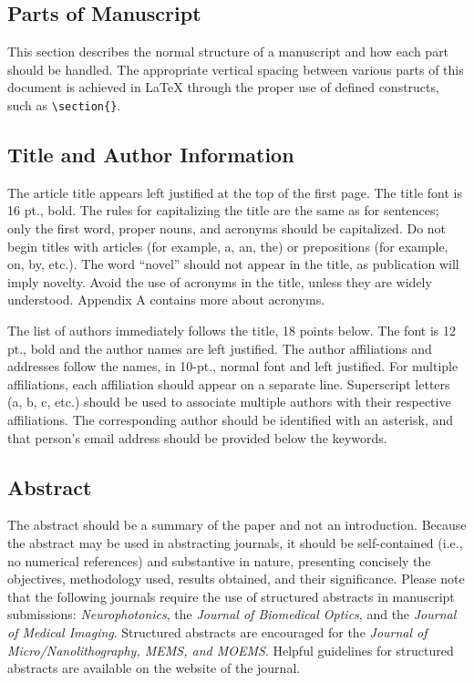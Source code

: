 \documentclass[12pt]{spieman}  %
\begin{document}
\begin{spacing}{2}
\section{Parts of Manuscript}

This section describes the normal structure of a manuscript and how each part should be handled. The appropriate vertical spacing between various parts of this document is achieved in LaTeX through the proper use of defined constructs, such as \verb|\section{}|.

\subsection{Title and Author Information}
\label{sect:title}
The article title appears left justified at the top of the first page. The title font is 16 pt., bold. The rules for capitalizing the title are the same as for sentences; only the first word, proper nouns, and acronyms should be capitalized. Do not begin titles with articles (for example, a, an, the) or prepositions (for example, on, by, etc.). The word ``novel'' should not appear in the title, as publication will imply novelty. Avoid the use of acronyms in the title, unless they are widely understood. Appendix A contains more about acronyms.

The list of authors immediately follows the title, 18 points below. The font is 12 pt., bold and the author names are left justified. The author affiliations and addresses follow the names, in 10-pt., normal font and left justified. For multiple affiliations, each affiliation should appear on a separate line. Superscript letters (a, b, c, etc.) should be used to associate multiple authors with their respective affiliations. The corresponding author should be identified with an asterisk, and that person's email address should be provided below the keywords.

\subsection{Abstract}
The abstract should be a summary of the paper and not an introduction. Because the abstract may be used in abstracting journals, it should be self-contained (i.e., no numerical references) and substantive in nature, presenting concisely the objectives, methodology used, results obtained, and their significance. Please note that the following journals require the use of structured abstracts in manuscript submissions: \textit{Neurophotonics}, the \textit{Journal of Biomedical Optics}, and the\textit{ Journal of Medical Imaging}. Structured abstracts are encouraged for the \textit{Journal of Micro/Nanolithography, MEMS, and MOEMS}. Helpful guidelines for structured abstracts are available on the website of the journal.


\end{spacing}
\end{document}
